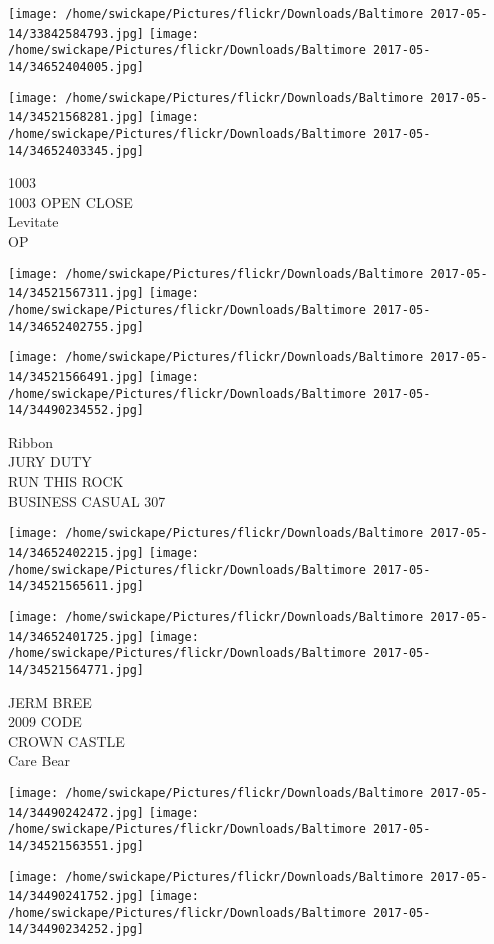 \documentclass[10pt,letterpaper]{article}
\begin{document}
\texttt{[image: /home/swickape/Pictures/flickr/Downloads/Baltimore 2017-05-14/33842584793.jpg]}
\texttt{[image: /home/swickape/Pictures/flickr/Downloads/Baltimore 2017-05-14/34652404005.jpg]}

\texttt{[image: /home/swickape/Pictures/flickr/Downloads/Baltimore 2017-05-14/34521568281.jpg]}
\texttt{[image: /home/swickape/Pictures/flickr/Downloads/Baltimore 2017-05-14/34652403345.jpg]}

1003\\
1003 OPEN CLOSE\\
Levitate\\
OP
\pagebreak

\texttt{[image: /home/swickape/Pictures/flickr/Downloads/Baltimore 2017-05-14/34521567311.jpg]}
\texttt{[image: /home/swickape/Pictures/flickr/Downloads/Baltimore 2017-05-14/34652402755.jpg]}

\texttt{[image: /home/swickape/Pictures/flickr/Downloads/Baltimore 2017-05-14/34521566491.jpg]}
\texttt{[image: /home/swickape/Pictures/flickr/Downloads/Baltimore 2017-05-14/34490234552.jpg]}

Ribbon\\
JURY DUTY\\
RUN THIS ROCK\\
BUSINESS CASUAL 307
\pagebreak

\texttt{[image: /home/swickape/Pictures/flickr/Downloads/Baltimore 2017-05-14/34652402215.jpg]}
\texttt{[image: /home/swickape/Pictures/flickr/Downloads/Baltimore 2017-05-14/34521565611.jpg]}

\texttt{[image: /home/swickape/Pictures/flickr/Downloads/Baltimore 2017-05-14/34652401725.jpg]}
\texttt{[image: /home/swickape/Pictures/flickr/Downloads/Baltimore 2017-05-14/34521564771.jpg]}

JERM BREE\\
2009 CODE\\
CROWN CASTLE\\
Care Bear
\pagebreak

\texttt{[image: /home/swickape/Pictures/flickr/Downloads/Baltimore 2017-05-14/34490242472.jpg]}
\texttt{[image: /home/swickape/Pictures/flickr/Downloads/Baltimore 2017-05-14/34521563551.jpg]}

\texttt{[image: /home/swickape/Pictures/flickr/Downloads/Baltimore 2017-05-14/34490241752.jpg]}
\texttt{[image: /home/swickape/Pictures/flickr/Downloads/Baltimore 2017-05-14/34490234252.jpg]}
\end{document}
